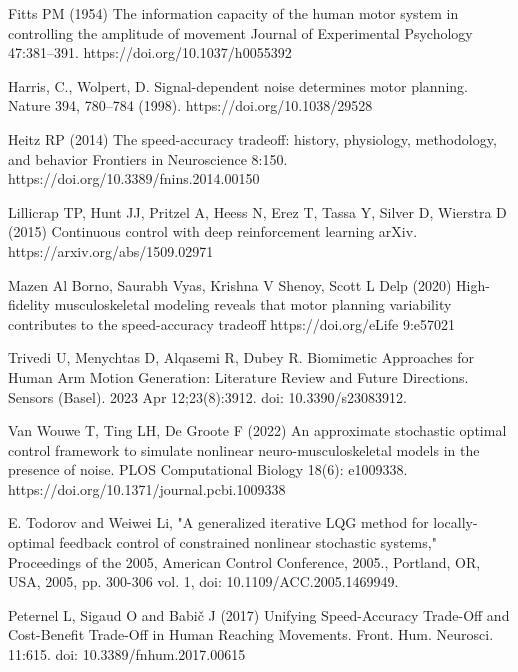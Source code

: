 \documentclass[table,12pt]{article}
\begin{document}
\begin{thebibliography}{99}
Fitts PM (1954) The information capacity of the human motor system in controlling the amplitude of movement Journal of Experimental Psychology 47:381–391. https://doi.org/10.1037/h0055392 

Harris, C., Wolpert, D. Signal-dependent noise determines motor planning. Nature 394, 780–784 (1998). https://doi.org/10.1038/29528

Heitz RP (2014) The speed-accuracy tradeoff: history, physiology, methodology, and behavior Frontiers in Neuroscience 8:150. https://doi.org/10.3389/fnins.2014.00150

Lillicrap TP, Hunt JJ, Pritzel A, Heess N, Erez T, Tassa Y, Silver D, Wierstra D (2015) Continuous control with deep reinforcement learning arXiv. https://arxiv.org/abs/1509.02971

Mazen Al Borno, Saurabh Vyas, Krishna V Shenoy, Scott L Delp (2020) High-fidelity musculoskeletal modeling reveals that motor planning variability contributes to the speed-accuracy tradeoff 
https://doi.org/eLife 9:e57021

Trivedi U, Menychtas D, Alqasemi R, Dubey R. Biomimetic Approaches for Human Arm Motion Generation: Literature Review and Future Directions. Sensors (Basel). 2023 Apr 12;23(8):3912. doi: 10.3390/s23083912.

Van Wouwe T, Ting LH, De Groote F (2022) An approximate stochastic optimal control framework to simulate nonlinear neuro-musculoskeletal models in the presence of noise. PLOS Computational Biology 18(6): e1009338. https://doi.org/10.1371/journal.pcbi.1009338

E. Todorov and Weiwei Li, "A generalized iterative LQG method for locally-optimal feedback control of constrained nonlinear stochastic systems," Proceedings of the 2005, American Control Conference, 2005., Portland, OR, USA, 2005, pp. 300-306 vol. 1, doi: 10.1109/ACC.2005.1469949.

Peternel L, Sigaud O and Babič J (2017) Unifying Speed-Accuracy Trade-Off and Cost-Benefit Trade-Off in Human Reaching Movements. Front. Hum. Neurosci. 11:615. doi: 10.3389/fnhum.2017.00615



\end{thebibliography}
\end{document}
